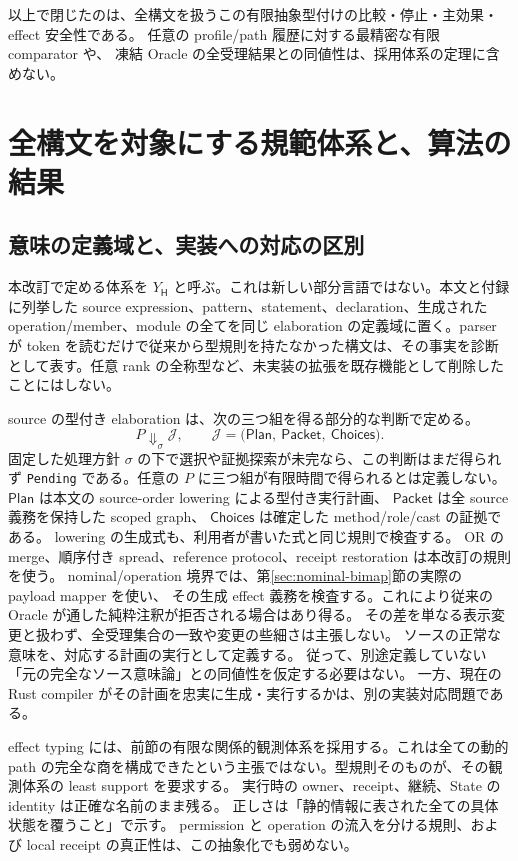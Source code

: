 \documentclass[11pt,a4paper]{article}
\theoremstyle{remark}
\begin{document}
以上で閉じたのは、全構文を扱うこの有限抽象型付けの比較・停止・主効果・effect 安全性である。
任意の profile/path 履歴に対する最精密な有限 comparator や、
凍結 Oracle の全受理結果との同値性は、採用体系の定理に含めない。



\section{全構文を対象にする規範体系と、算法の結果}
\label{sec:whole-closure}

\subsection{意味の定義域と、実装への対応の区別}

本改訂で定める体系を \(Y_{\mathsf H}\) と呼ぶ。これは新しい部分言語ではない。本文と付録に列挙した source expression、pattern、statement、declaration、生成された operation/member、module の全てを同じ elaboration の定義域に置く。parser が token を読むだけで従来から型規則を持たなかった構文は、その事実を診断として表す。任意 rank の全称型など、未実装の拡張を既存機能として削除したことにはしない。

source の型付き elaboration は、次の三つ組を得る部分的な判断で定める。
\[
P\Downarrow_{\sigma}\mathcal J,\qquad
\mathcal J=\bigl(\mathsf{Plan},\ \mathsf{Packet},\ \mathsf{Choices}\bigr).
\]
固定した処理方針 \(\sigma\) の下で選択や証拠探索が未完なら、この判断はまだ得られず
\texttt{Pending} である。任意の \(P\) に三つ組が有限時間で得られるとは定義しない。
\(\mathsf{Plan}\) は本文の source-order lowering による型付き実行計画、
\(\mathsf{Packet}\) は全 source 義務を保持した scoped graph、
\(\mathsf{Choices}\) は確定した method/role/cast の証拠である。
lowering の生成式も、利用者が書いた式と同じ規則で検査する。
OR の merge、順序付き spread、reference protocol、receipt restoration は本改訂の規則を使う。
nominal/operation 境界では、第\ref{sec:nominal-bimap}節の実際の payload mapper を使い、
その生成 effect 義務を検査する。これにより従来の Oracle が通した純粋注釈が拒否される場合はあり得る。
その差を単なる表示変更と扱わず、全受理集合の一致や変更の些細さは主張しない。
ソースの正常な意味を、対応する計画の実行として定義する。
従って、別途定義していない「元の完全なソース意味論」との同値性を仮定する必要はない。
一方、現在の Rust compiler がその計画を忠実に生成・実行するかは、別の実装対応問題である。

effect typing には、前節の有限な関係的観測体系を採用する。これは全ての動的 path の完全な商を構成できたという主張ではない。型規則そのものが、その観測体系の least support を要求する。
実行時の owner、receipt、継続、State の identity は正確な名前のまま残る。
正しさは「静的情報に表された全ての具体状態を覆うこと」で示す。
permission と operation の流入を分ける規則、および local receipt の真正性は、この抽象化でも弱めない。
\end{document}
